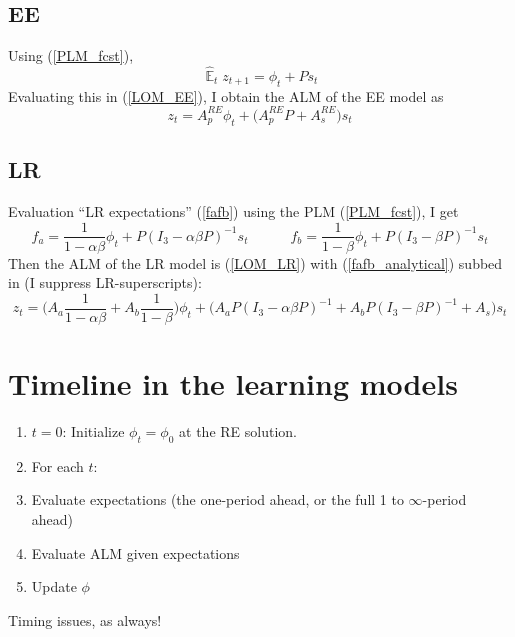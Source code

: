 \documentclass[11pt]{article}
\renewcommand{\[}{\begin{equation}}
\renewcommand{\]}{\end{equation}}
\DeclareMathOperator{\E}{\mathbb{E}}
\begin{document}
\subsection{EE}
Using (\ref{PLM_fcst}),
\begin{equation}
\hat{\E}_t z_{t+1} = \phi_{t} + Ps_t 
\end{equation}
Evaluating this in (\ref{LOM_EE}), I obtain the ALM of the EE model as
\begin{equation}
z_t = A_p^{RE}\phi_t + \big( A_p^{RE} P + A_s^{RE} \big)s_t \label{ALM_EE}
\end{equation}


\subsection{LR}
Evaluation ``LR expectations'' (\ref{fafb}) using the PLM (\ref{PLM_fcst}), I get
\begin{equation}
f_a = \frac{1}{1-\alpha\beta}\phi_t + P(I_3 - \alpha\beta P)^{-1}s_t \quad \quad \quad f_b = \frac{1}{1-\beta}\phi_t + P(I_3 - \beta P)^{-1}s_t  \label{fafb_analytical}
\end{equation}
Then the ALM of the LR model is (\ref{LOM_LR}) with (\ref{fafb_analytical}) subbed in (I suppress LR-superscripts):
\begin{equation}
z_t = \big( A_a \frac{1}{1-\alpha\beta} + A_b \frac{1}{1-\beta}\big)\phi_t + \big(A_aP(I_3 - \alpha\beta P)^{-1} +A_bP(I_3 - \beta P)^{-1} +A_s \big)s_t 
\end{equation}



\section{Timeline in the learning models}
\begin{enumerate}
\item[] \underline{$t=0$}: Initialize $\phi_t = \phi_0$ at the RE solution.
\item[] For each $t$:
\item Evaluate expectations (the one-period ahead, or the full 1 to $\infty$-period ahead)
\item Evaluate ALM given expectations
\item Update $\phi$
\end{enumerate}
Timing issues, as always!
\end{document}
